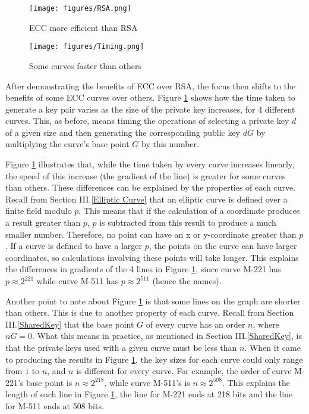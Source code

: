 \documentclass[12pt,a4paper]{article}
\begin{document}
\begin{figure}[!htb]
    \begin{minipage}{0.5\textwidth}
        \centering
        \texttt{[image: figures/RSA.png]}
        \caption{ECC more efficient than RSA}
        \label{fig:rsa}
    \end{minipage}\hfill
    \begin{minipage}{0.5\textwidth}
        \centering
        \texttt{[image: figures/Timing.png]}
        \caption{Some curves faster than others}
        \label{fig:curves}
    \end{minipage}
\end{figure}

After demonstrating the benefits of ECC over RSA, the focus then shifts to the benefits of some ECC curves over others. 
Figure \ref{fig:curves} shows how the time taken to generate a key pair varies as the size of the private key increases, for 4 different curves. 
This, as before, means timing the operations of selecting a private key $d$ of a given size and then generating the corresponding public key $dG$ by 
multiplying the curve's base point $G$ by this number. 

Figure \ref{fig:curves} illustrates that, while the time taken by every curve increases linearly, 
the speed of this increase (the gradient of the line) is greater for some curves than others. 
These differences can be explained by the properties of each curve. 
Recall from Section III.\ref{Elliptic Curve} that an elliptic curve is defined over a finite field modulo $p$. 
This means that if the calculation of a coordinate produces a result greater than $p$, $p$ is subtracted from this result to produce a much smaller number. 
Therefore, no point can have an x or y-coordinate greater than $p$. 
If a curve is defined to have a larger $p$, the points on the curve can have larger coordinates, 
so calculations involving these points will take longer. 
This explains the differences in gradients of the 4 lines in Figure \ref{fig:curves}, 
since curve M-221 has $p \approx 2^{221}$ while curve M-511 has $p \approx 2^{511}$ (hence the names). 

Another point to note about Figure \ref{fig:curves} is that some lines on the graph are shorter than others. 
This is due to another property of each curve. 
Recall from Section III.\ref{SharedKey} that the base point $G$ of every curve has an order $n$, where $nG=0$. 
What this means in practice, as mentioned in Section III.\ref{SharedKey}, 
is that the private keys used with a given curve must be less than $n$. 
When it came to producing the results in Figure \ref{fig:curves}, the key sizes for each curve could only range from $1$ to $n$, 
and $n$ is different for every curve. 
For example, the order of curve M-221's base point is $n \approx 2^{218}$, while curve M-511's is $n \approx 2^{508}$. 
This explains the length of each line in Figure \ref{fig:curves}, the line for M-221 ends at 218 bits and the line for M-511 ends at 508 bits. 
\end{document}
